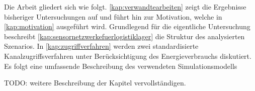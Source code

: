 Die Arbeit gliedert sich wie folgt. \autoref{kap:verwandtearbeiten} zeigt die Ergebnisse bisheriger Untersuchungen auf und führt hin zur Motivation, welche in \autoref{kap:motivation} ausgeführt wird. Grundlegend für die eigentliche Untersuchung beschreibt \autoref{kap:sensornetzwerkefuerlogistiklager} die Struktur des analysierten Szenarios. In \autoref{kap:zugriffverfahren} werden zwei standardisierte Kanalzugriffsverfahren unter Berücksichtigung des Energieverbrauchs diskutiert. Es folgt eine umfassende Beschreibung des verwendeten Simulationsmodells 

TODO: weitere Beschreibung der Kapitel vervollständigen.





